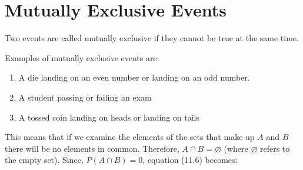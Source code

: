             \section{ Mutually Exclusive Events}
            \nopagebreak
            \label{m39377*id114732}Two events are called mutually exclusive if they cannot be
true at the same time.\par 
      \label{m39377*id114736}Examples of mutually exclusive events are:\par 
      \label{m39377*id114740}\begin{enumerate}[noitemsep, label=\textbf{\arabic*}. ] 
            \label{m39377*uid76}\item A die landing on an even number or landing on an odd
number.
\label{m39377*uid77}\item A student passing or failing an exam
\label{m39377*uid78}\item A tossed coin landing on heads or landing on tails
\end{enumerate}
      \label{m39377*id114782}This means that if we examine the elements of the sets
that make up $A$ and \begin{math}B\end{math} there will be no elements in common.
Therefore, $A\cap B=\varnothing $ (where \begin{math}\varnothing \end{math} refers to the empty set). Since,
$P\left(A\cap B\right)=0$,
equation (11.6) becomes:\par 
      \label{m39377*id114861}\nopagebreak\noindent{}
